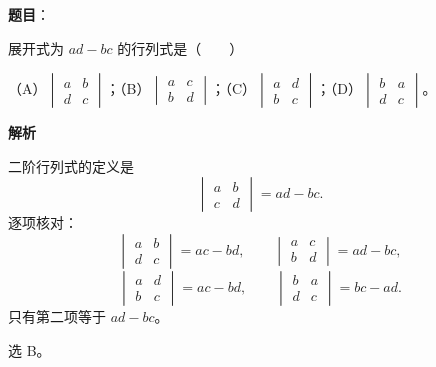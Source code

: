 \begin{answer}

\textbf{题目}：

展开式为 $ad-bc$ 的行列式是\mbox{（　　）}

（A）$\begin{vmatrix}a&b\\d&c\end{vmatrix}$；（B）$\begin{vmatrix}a&c\\b&d\end{vmatrix}$；（C）$\begin{vmatrix}a&d\\b&c\end{vmatrix}$；（D）$\begin{vmatrix}b&a\\d&c\end{vmatrix}$。

\textbf{解析}

二阶行列式的定义是
\nopagebreak[4]
\[\begin{vmatrix}a&b\\c&d\end{vmatrix}=ad-bc.\]
逐项核对：
\nopagebreak[4]
\[\begin{vmatrix}a&b\\d&c\end{vmatrix}=ac-bd,\qquad
\begin{vmatrix}a&c\\b&d\end{vmatrix}=ad-bc,\]
\nopagebreak[4]
\[\begin{vmatrix}a&d\\b&c\end{vmatrix}=ac-bd,\qquad
\begin{vmatrix}b&a\\d&c\end{vmatrix}=bc-ad.\]
只有第二项等于 $ad-bc$。

选 B。


\end{answer}
